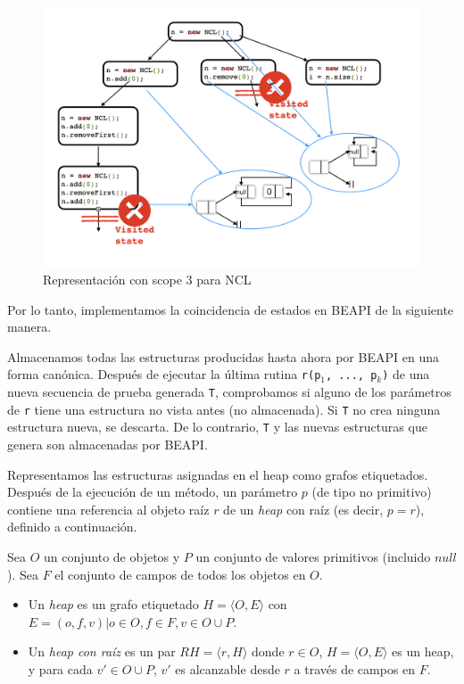 \begin{figure}[H]
  \centering
  \includegraphics[width=1\textwidth]{images/stateMatching1.jpg}
  \caption{Representación con scope 3 para NCL }
  \label{fig:stateMatching}
\end{figure}

Por lo tanto, implementamos la coincidencia de estados en \textsf{BEAPI} de la siguiente manera.

Almacenamos todas las estructuras producidas hasta ahora por \textsf{BEAPI} en una forma canónica. Después de ejecutar la última rutina \texttt{r(p$_1$, ..., p$_k$)} de una nueva secuencia de prueba generada \texttt{T}, comprobamos si alguno de los parámetros de \texttt{r} tiene una estructura no vista antes (no almacenada). Si \texttt{T} no crea ninguna estructura nueva, se descarta. De lo contrario, \texttt{T} y las nuevas estructuras que genera son almacenadas por \textsf{BEAPI}.

Representamos las estructuras asignadas en el heap como grafos etiquetados. Después de la ejecución de un método, un parámetro $p$ (de tipo no primitivo) contiene una referencia al objeto raíz $r$ de un \emph{heap} con raíz (es decir, $p=r$), definido a continuación.

\begin{definition}
Sea $O$ un conjunto de objetos y $P$ un conjunto de valores primitivos (incluido $null$). Sea $F$ el conjunto de campos de todos los objetos en $O$.
\begin{itemize}
\item Un \emph{heap} es un grafo etiquetado $H = \langle O, E\rangle$ con $E = {(o, f, v) | o \in O, f \in F, v \in O \cup P}$.
\item Un \emph{heap con raíz} es un par $RH = \langle r, H \rangle$ donde $r \in O$, $H = \langle O, E\rangle$ es un heap, y para cada $v' \in O \cup P$, $v'$ es alcanzable desde $r$ a través de campos en $F$.
\end{itemize}
\end{definition}

